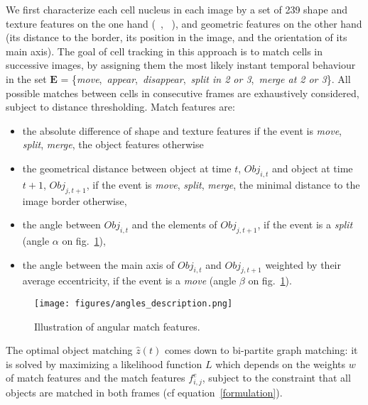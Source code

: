 We first characterize each cell nucleus in each image by a set of 239 shape and texture features on the one hand (~\cite{Walter2010}, ~\cite{cellcognition}), and geometric features on the other hand (its distance to the border, its position in the image, and the orientation of its main axis). The goal of cell tracking in this approach is to match cells in successive images, by assigning
them the most likely instant temporal behaviour in the set $\mathbf{E}$ = \{\textit{move},~\textit{appear},~\textit{disappear},~\textit{split in 2 or 3},~\textit{merge at 2 or 3}\}. All possible matches between
cells in consecutive frames are exhaustively considered, subject to
distance thresholding. Match features are: 
\begin{itemize}
\item the absolute difference of shape and texture features if the event is \textit{move}, \textit{split}, \textit{merge}, the object features otherwise
\item the geometrical distance between object at time $t$, $Obj_{i, t}$ and object at time $t+1$, $Obj_{j, t+1}$, if the event is \textit{move}, \textit{split}, \textit{merge}, the minimal distance to the image border otherwise,
\item the angle between $Obj_{i, t}$ and the elements of $Obj_{j, t+1}$, if the event is a \textit{split} (angle $\alpha$ on fig.~\ref{fig:angles}),
\item the angle between the main axis of $Obj_{i, t}$ and $Obj_{j, t+1}$ weighted by their average eccentricity, if the event is a \textit{move} (angle $\beta$ on fig.~\ref{fig:angles}).
\end{itemize}

\begin{figure}[ht]
\centerline{\texttt{[image: figures/angles\_description.png]}}
\caption{Illustration of angular match features.}
\label{fig:angles}
\end{figure}


The optimal object matching $\widehat{z}(t)$ comes down to bi-partite graph matching: it is solved by maximizing a likelihood function $L$ which depends on the weights $w$ of match features and the match features $f^e_{i, j}$, subject to the constraint that all objects are matched in both frames (cf equation~\ref{formulation}).

